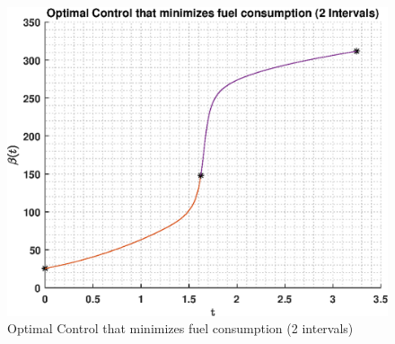 \documentclass[]{article}
\begin{document}
\begin{figure}
	\centering
	\includegraphics[scale=0.75]{indirectMultiControl.eps}
	\caption{Optimal Control that minimizes fuel consumption (2 intervals)}
	\label{fig:indirectMultiControl}
\end{figure}
\FloatBarrier
\end{document}
